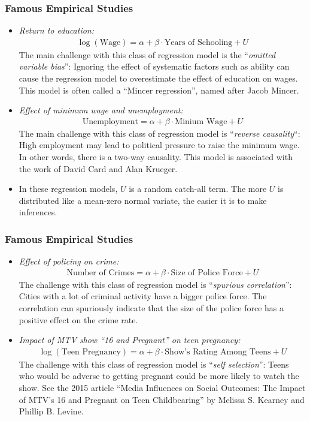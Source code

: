 

\begin{frame}
\frametitle{Famous Empirical Studies}
\begin{itemize}
\item \emph{Return to education:} 
\begin{align*}
\log(\text{Wage}) 
  = \alpha + \beta \cdot \text{Years of Schooling} + U
\end{align*}
The main challenge with this class of regression model is the ``\emph{omitted variable bias}'': Ignoring the effect of systematic factors such as ability can cause the regression model to overestimate the effect of education on wages. This model is often called a ``Mincer regression'', named after Jacob Mincer. 
\item \emph{Effect of minimum wage and unemployment:} 
\begin{align*}
\text{Unemployment} 
  = \alpha + \beta \cdot \text{Minium Wage} + U 
\end{align*}
The main challenge with this class of regression model is ``\emph{reverse causality}``: High employment may lead to political pressure to raise the minimum wage. In other words, there is a two-way causality. This model is associated with the work of David Card and Alan Krueger. 
\item In these regression models, $U$ is a random catch-all term. The more $U$ is distributed like a mean-zero normal variate, the easier it is to make inferences.
\end{itemize}
\end{frame}


\begin{frame}
\frametitle{Famous Empirical Studies}
\begin{itemize}
\item \emph{Effect of policing on crime:} 
\begin{align*}
\text{Number of Crimes} 
  = \alpha + \beta \cdot \text{Size of Police Force} + U
\end{align*}
The challenge with this class of regression model is ``\emph{spurious correlation}'':
Cities with a lot of criminal activity have a bigger police force. The correlation can spuriously indicate that the size of the police force has a positive effect on the crime rate. 
\item \emph{Impact of MTV show ``16 and Pregnant'' on teen pregnancy:}
\begin{align*}
\log(\text{Teen Pregnancy})
  = \alpha + \beta \cdot \text{Show's Rating Among Teens} + U
\end{align*}
The challenge with this class of regression model is ``\emph{self selection}'': 
Teens who would be adverse to getting pregnant could be more likely to watch the show. See the 2015 article ``Media Influences on Social Outcomes: The Impact of MTV's 16 and Pregnant on Teen Childbearing'' by Melissa S. Kearney and Phillip B. Levine.
\end{itemize}
\end{frame}

